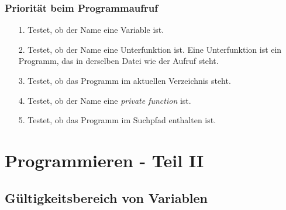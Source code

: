 \begin{frame}[fragile]\frametitle{Priorität beim Programmaufruf}
\begin{itemize}
\item [1.] Testet, ob der Name eine Variable ist.
\item [2.] Testet, ob der Name eine Unterfunktion ist. Eine
  Unterfunktion ist ein Programm, das in derselben Datei wie der
  Aufruf steht.
\item [3.] Testet, ob das Programm im aktuellen Verzeichnis steht.
\item [4.] Testet, ob der Name eine {\it private function} ist.
\item [5.] Testet, ob das Programm im Suchpfad enthalten ist. 
\end{itemize}
\end{frame}


\section{Programmieren - Teil II}
\subsection{Gültigkeitsbereich von Variablen}
 
